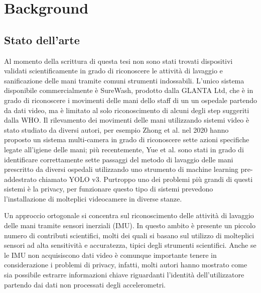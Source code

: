 \chapter{Background}
\label{cap:background}

\section{Stato dell'arte}

Al momento della scrittura di questa tesi non sono stati trovati dispositivi validati scientificamente in grado di riconoscere le attività di lavaggio e 
sanificazione delle mani tramite comuni strumenti indossabili. L'unico sistema disponibile commercialmente è SureWash, prodotto dalla GLANTA Ltd, che è in grado 
di riconoscere i movimenti delle mani dello staff di un un ospedale partendo da dati video, ma è limitato al solo riconoscimento di alcuni degli step suggeriti dalla WHO.
Il rilevamento dei movimenti delle mani utilizzando sistemi video è stato studiato da diversi autori, per esempio Zhong et al. nel 2020 hanno proposto un sistema multi-camera
in grado di riconoscere sette azioni specifiche legate all'igiene delle mani\cite{zhong2020multi}; più recentemente, Yue et al. sono stati in grado di identificare correttamente 
sette passaggi del metodo di lavaggio delle mani prescritto da diversi ospedali utilizzando uno strumento di machine learning pre-addestrato chiamato YOLO v3\cite{yue2021intelligent}.
Purtroppo uno dei problemi più grandi di questi sistemi è la privacy, per funzionare questo tipo di sistemi prevedono l'installazione di molteplici videocamere 
in diverse stanze.

Un approccio ortogonale si concentra sul riconoscimento delle attività di lavaggio delle mani tramite sensori inerziali (IMU). In questo ambito è presente un piccolo numero di contributi 
scientifici, molti dei quali si basano sul utilizzo di molteplici sensori ad alta sensitività e accuratezza, tipici degli strumenti scientifici\cite{galluzzi2015hand}\cite{bal2017system}\cite{li2018wristwash}. 
Anche se le IMU non acquisiscono dati video è comunque importante tenere in considerazione i problemi di privacy, infatti, molti autori hanno mostrato come sia possibile estrarre 
informazioni chiave riguardanti l'identità dell'utilizzatore partendo dai dati non processati degli accelerometri\cite{jain2018gender}\cite{van2019systematic}.

